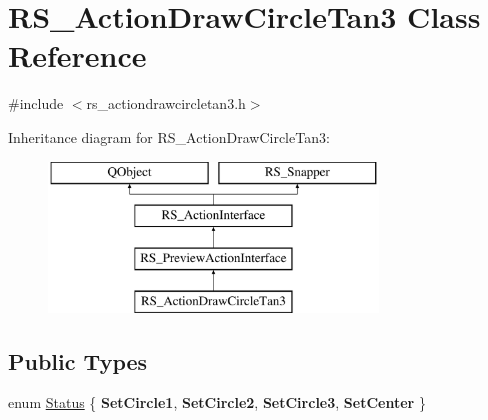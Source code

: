\hypertarget{classRS__ActionDrawCircleTan3}{\section{R\-S\-\_\-\-Action\-Draw\-Circle\-Tan3 Class Reference}
\label{classRS__ActionDrawCircleTan3}
}


{\ttfamily \#include $<$rs\-\_\-actiondrawcircletan3.\-h$>$}

Inheritance diagram for R\-S\-\_\-\-Action\-Draw\-Circle\-Tan3\-:\begin{figure}[H]
\begin{center}
\leavevmode
\includegraphics[height=4.000000cm]{classRS__ActionDrawCircleTan3}
\end{center}
\end{figure}
\subsection*{Public Types}
\begin{DoxyCompactItemize}
\item 
enum \hyperlink{classRS__ActionDrawCircleTan3_aa9122b5e64b1da79fcb653f3271ef53f}{Status} \{ {\bfseries Set\-Circle1}, 
{\bfseries Set\-Circle2}, 
{\bfseries Set\-Circle3}, 
{\bfseries Set\-Center}
 \}
\end{DoxyCompactItemize}
